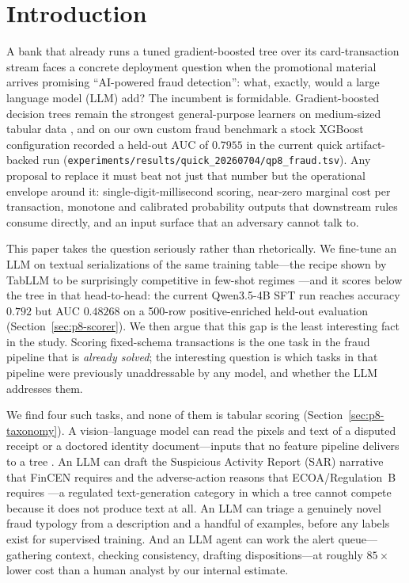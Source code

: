 \documentclass{article}
\providecommand{\secref}[1]{Section~\ref{#1}}
\begin{document}
 \section{Introduction}
\label{sec:p8-intro}

A bank that already runs a tuned gradient-boosted tree over its card-transaction
stream faces a concrete deployment question when the promotional material arrives
promising ``AI-powered fraud detection'': what, exactly, would a large language
model (LLM) add? The incumbent is formidable. Gradient-boosted decision trees
remain the strongest general-purpose learners on medium-sized tabular data
\citep{grinsztajn2022tree, shwartzziv2021tabular}, and on our own custom fraud
benchmark a stock XGBoost \citep{chen2016xgboost} configuration recorded a
held-out AUC of $0.7955$ in the current quick artifact-backed run
(\texttt{experiments/results/quick\_20260704/qp8\_fraud.tsv}). Any
proposal to replace it must beat not just that number but the operational
envelope around it: single-digit-millisecond scoring, near-zero marginal cost
per transaction, monotone and calibrated probability outputs that downstream
rules consume directly, and an input surface that an adversary cannot talk to.

This paper takes the question seriously rather than rhetorically. We fine-tune
an LLM on textual serializations of the same training table---the recipe shown
by TabLLM to be surprisingly competitive in few-shot regimes
\citep{hegselmann2023tabllm}---and it scores below the tree in that
head-to-head: the current Qwen3.5-4B SFT run reaches accuracy $0.792$ but AUC
$0.48268$ on a 500-row positive-enriched held-out evaluation
(\secref{sec:p8-scorer}). We then argue
that this gap is the least interesting fact in the study. Scoring
fixed-schema transactions is the one task in the fraud pipeline that is
\emph{already solved}; the interesting question is which tasks in that pipeline
were previously unaddressable by any model, and whether the LLM addresses them.

We find four such tasks, and none of them is tabular scoring
(\secref{sec:p8-taxonomy}). A vision--language model can read the pixels and
text of a disputed receipt or a doctored identity document---inputs that no
feature pipeline delivers to a tree \citep{xu2024fakeshield,
wang2025forensicsbench}. An LLM can draft the Suspicious Activity Report (SAR)
narrative that FinCEN requires and the adverse-action reasons that
ECOA/Regulation~B requires \citep{fincen2003sarnarrative, cfr1002_9}---a
regulated text-generation category in which a tree cannot compete because it
does not produce text at all. An LLM can triage a genuinely novel fraud
typology from a description and a handful of examples, before any labels exist
for supervised training. And an LLM agent can work the alert queue---gathering
context, checking consistency, drafting dispositions---at roughly $85\times$
lower cost than a human analyst by our internal estimate.
\end{document}
